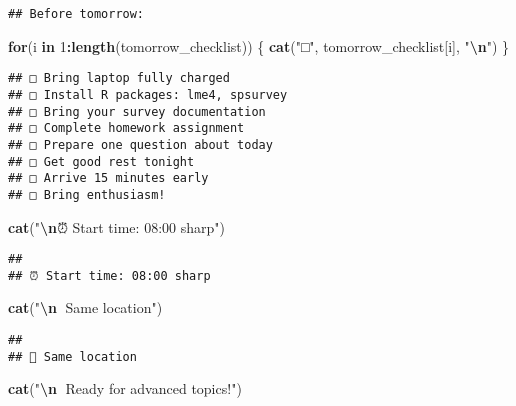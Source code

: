 \documentclass[
]{article}
\newenvironment{Shaded}{\begin{snugshade}}{\end{snugshade}}
\newcommand{\ControlFlowTok}[1]{\textcolor[rgb]{0.13,0.29,0.53}{\textbf{#1}}}
\newcommand{\DecValTok}[1]{\textcolor[rgb]{0.00,0.00,0.81}{#1}}
\newcommand{\FunctionTok}[1]{\textcolor[rgb]{0.13,0.29,0.53}{\textbf{#1}}}
\newcommand{\NormalTok}[1]{#1}
\newcommand{\SpecialCharTok}[1]{\textcolor[rgb]{0.81,0.36,0.00}{\textbf{#1}}}
\newcommand{\StringTok}[1]{\textcolor[rgb]{0.31,0.60,0.02}{#1}}
\begin{document}
\begin{verbatim}
## Before tomorrow:
\end{verbatim}

\begin{Shaded}
\begin{Highlighting}[]
\ControlFlowTok{for}\NormalTok{(i }\ControlFlowTok{in} \DecValTok{1}\SpecialCharTok{:}\FunctionTok{length}\NormalTok{(tomorrow\_checklist)) \{}
  \FunctionTok{cat}\NormalTok{(}\StringTok{"□"}\NormalTok{, tomorrow\_checklist[i], }\StringTok{"}\SpecialCharTok{\textbackslash{}n}\StringTok{"}\NormalTok{)}
\NormalTok{\}}
\end{Highlighting}
\end{Shaded}

\begin{verbatim}
## □ Bring laptop fully charged 
## □ Install R packages: lme4, spsurvey 
## □ Bring your survey documentation 
## □ Complete homework assignment 
## □ Prepare one question about today 
## □ Get good rest tonight 
## □ Arrive 15 minutes early 
## □ Bring enthusiasm!
\end{verbatim}

\begin{Shaded}
\begin{Highlighting}[]
\FunctionTok{cat}\NormalTok{(}\StringTok{"}\SpecialCharTok{\textbackslash{}n}\StringTok{⏰ Start time: 08:00 sharp"}\NormalTok{)}
\end{Highlighting}
\end{Shaded}

\begin{verbatim}
## 
## ⏰ Start time: 08:00 sharp
\end{verbatim}

\begin{Shaded}
\begin{Highlighting}[]
\FunctionTok{cat}\NormalTok{(}\StringTok{"}\SpecialCharTok{\textbackslash{}n}\StringTok{📍 Same location"}\NormalTok{)}
\end{Highlighting}
\end{Shaded}

\begin{verbatim}
## 
## 📍 Same location
\end{verbatim}

\begin{Shaded}
\begin{Highlighting}[]
\FunctionTok{cat}\NormalTok{(}\StringTok{"}\SpecialCharTok{\textbackslash{}n}\StringTok{💪 Ready for advanced topics!"}\NormalTok{)}
\end{Highlighting}
\end{Shaded}
\end{document}
